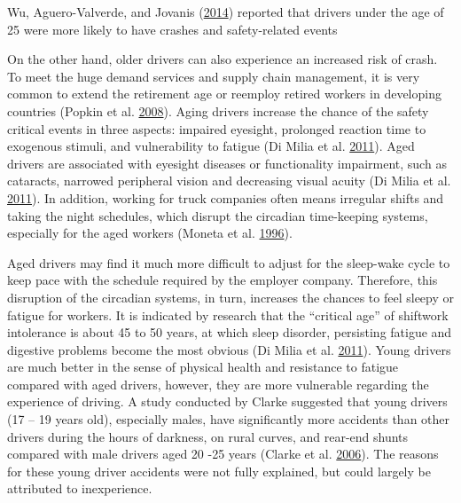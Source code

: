 \documentclass[12pt]{book}
\numberwithin{equation}{chapter}
\begin{document}
Wu, Aguero-Valverde, and Jovanis (\protect\hyperlink{ref-wu2014using}{2014}) reported that drivers under the age of 25 were more likely to have crashes and safety-related events

On the other hand, older drivers can also experience an increased risk of crash. To meet the huge demand services and supply chain management, it is very common to extend the retirement age or reemploy retired workers in developing countries (Popkin et al. \protect\hyperlink{ref-popkin2008age}{2008}). Aging drivers increase the chance of the safety critical events in three aspects: impaired eyesight, prolonged reaction time to exogenous stimuli, and vulnerability to fatigue (Di Milia et al. \protect\hyperlink{ref-di2011demographic}{2011}). Aged drivers are associated with eyesight diseases or functionality impairment, such as cataracts, narrowed peripheral vision and decreasing visual acuity (Di Milia et al. \protect\hyperlink{ref-di2011demographic}{2011}). In addition, working for truck companies often means irregular shifts and taking the night schedules, which disrupt the circadian time-keeping systems, especially for the aged workers (Moneta et al. \protect\hyperlink{ref-moneta1996time}{1996}).

Aged drivers may find it much more difficult to adjust for the sleep-wake cycle to keep pace with the schedule required by the employer company. Therefore, this disruption of the circadian systems, in turn, increases the chances to feel sleepy or fatigue for workers. It is indicated by research that the ``critical age'' of shiftwork intolerance is about 45 to 50 years, at which sleep disorder, persisting fatigue and digestive problems become the most obvious (Di Milia et al. \protect\hyperlink{ref-di2011demographic}{2011}). Young drivers are much better in the sense of physical health and resistance to fatigue compared with aged drivers, however, they are more vulnerable regarding the experience of driving. A study conducted by Clarke suggested that young drivers (17 -- 19 years old), especially males, have significantly more accidents than other drivers during the hours of darkness, on rural curves, and rear-end shunts compared with male drivers aged 20 -25 years (Clarke et al. \protect\hyperlink{ref-clarke2006young}{2006}). The reasons for these young driver accidents were not fully explained, but could largely be attributed to inexperience.
\end{document}
